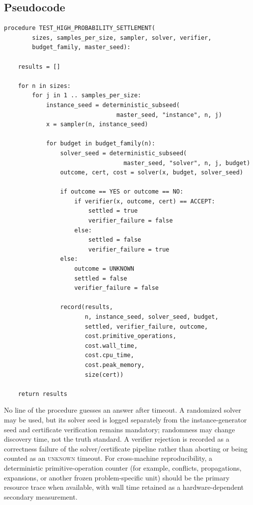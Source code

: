 \documentclass[11pt]{article}
\theoremstyle{definition}
\newcommand{\UNKNOWN}{\textsc{unknown}}
\begin{document}
\subsection*{Pseudocode}
\begin{Verbatim}[fontsize=\small]
procedure TEST_HIGH_PROBABILITY_SETTLEMENT(
        sizes, samples_per_size, sampler, solver, verifier,
        budget_family, master_seed):

    results = []

    for n in sizes:
        for j in 1 .. samples_per_size:
            instance_seed = deterministic_subseed(
                                master_seed, "instance", n, j)
            x = sampler(n, instance_seed)

            for budget in budget_family(n):
                solver_seed = deterministic_subseed(
                                  master_seed, "solver", n, j, budget)
                outcome, cert, cost = solver(x, budget, solver_seed)

                if outcome == YES or outcome == NO:
                    if verifier(x, outcome, cert) == ACCEPT:
                        settled = true
                        verifier_failure = false
                    else:
                        settled = false
                        verifier_failure = true
                else:
                    outcome = UNKNOWN
                    settled = false
                    verifier_failure = false

                record(results,
                       n, instance_seed, solver_seed, budget,
                       settled, verifier_failure, outcome,
                       cost.primitive_operations,
                       cost.wall_time,
                       cost.cpu_time,
                       cost.peak_memory,
                       size(cert))

    return results
\end{Verbatim}

No line of the procedure guesses an answer after timeout. A randomized solver may be used, but its solver seed is logged separately from the instance-generator seed and certificate verification remains mandatory; randomness may change discovery time, not the truth standard. A verifier rejection is recorded as a correctness failure of the solver/certificate pipeline rather than aborting or being counted as an \UNKNOWN{} timeout. For cross-machine reproducibility, a deterministic primitive-operation counter (for example, conflicts, propagations, expansions, or another frozen problem-specific unit) should be the primary resource trace when available, with wall time retained as a hardware-dependent secondary measurement.
\end{document}
